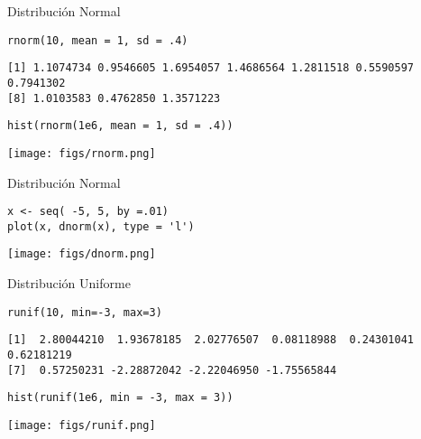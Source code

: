 \documentclass[xcolor={usenames,svgnames,dvipsnames}]{beamer}
\begin{document}
\begin{frame}[fragile,label={sec:org716f272}]{Distribución Normal}
 \lstset{language=r,label= ,caption= ,captionpos=b,numbers=none}
\begin{lstlisting}
rnorm(10, mean = 1, sd = .4)
\end{lstlisting}

\begin{verbatim}
[1] 1.1074734 0.9546605 1.6954057 1.4686564 1.2811518 0.5590597 0.7941302
[8] 1.0103583 0.4762850 1.3571223
\end{verbatim}

\lstset{language=r,label= ,caption= ,captionpos=b,numbers=none}
\begin{lstlisting}
hist(rnorm(1e6, mean = 1, sd = .4))
\end{lstlisting}

\begin{center}
\texttt{[image: figs/rnorm.png]}
\end{center}
\end{frame}

\begin{frame}[fragile,label={sec:org99ef609}]{Distribución Normal}
 \lstset{language=r,label= ,caption= ,captionpos=b,numbers=none}
\begin{lstlisting}
x <- seq( -5, 5, by =.01)
plot(x, dnorm(x), type = 'l')
\end{lstlisting}

\begin{center}
\texttt{[image: figs/dnorm.png]}
\end{center}
\end{frame}

\begin{frame}[fragile,label={sec:orgafe6f8c}]{Distribución Uniforme}
 \lstset{language=r,label= ,caption= ,captionpos=b,numbers=none}
\begin{lstlisting}
runif(10, min=-3, max=3)
\end{lstlisting}

\begin{verbatim}
[1]  2.80044210  1.93678185  2.02776507  0.08118988  0.24301041  0.62181219
[7]  0.57250231 -2.28872042 -2.22046950 -1.75565844
\end{verbatim}


\lstset{language=r,label= ,caption= ,captionpos=b,numbers=none}
\begin{lstlisting}
hist(runif(1e6, min = -3, max = 3))
\end{lstlisting}

\begin{center}
\texttt{[image: figs/runif.png]}
\end{center}
\end{frame}
\end{document}
